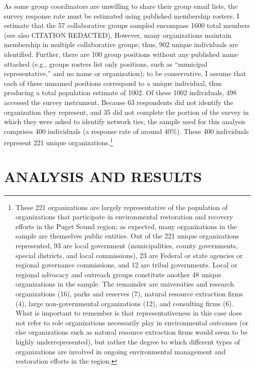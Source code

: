 \documentclass[12pt,a4paper,titlepage]{article}
\begin{document}
As some group coordinators are unwilling to share their group email lists, the survey response rate must be estimated using published membership rosters. I estimate that the 57 collaborative groups sampled encompass 1600 total members (see also CITATION REDACTED). However, many organizations maintain membership in multiple collaborative groups; thus, 902 unique individuals are identified. Further, there are 100 group positions without any published name attached (e.g., groups rosters list only positions, such as “municipal representative,'' and no name or organization); to be conservative, I assume that each of these unnamed positions correspond to a unique individual, thus producing a total population estimate of 1002. Of these 1002 individuals, 498 accessed the survey instrument. Because 63 respondents did not identify the organization they represent, and 35 did not complete the portion of the survey in which they were asked to identify network ties, the sample used for this analysis comprises 400 individuals (a response rate of around 40\%). These 400 individuals represent 221 unique organizations.\footnote{These 221 organizations are largely representative of the population of organizations that participate in environmental restoration and recovery efforts in the Puget Sound region; as expected, many organizations in the sample are themselves public entities. Out of the 221 unique organizations represented, 93 are local government (municipalities, county governments, special districts, and local commissions), 23 are Federal or state agencies or regional governance commissions, and 12 are tribal governments. Local or regional advocacy and outreach groups constitute another 48 unique organizations in the sample. The remainder are universities and research organizations (16), parks and reserves (7), natural resource extraction firms (4), large non-governmental organizations (12), and consulting firms (6). What is important to remember is that representativeness in this case does not refer to role organizations necessarily play in environmental outcomes (or else organizations such as natural resource extraction firms would seem to be highly underrepresented), but rather the degree to which different types of organizations are involved in ongoing environmental management and restoration efforts in the region.}


\section{\bf\MakeUppercase{Analysis and Results}}
\end{document}
